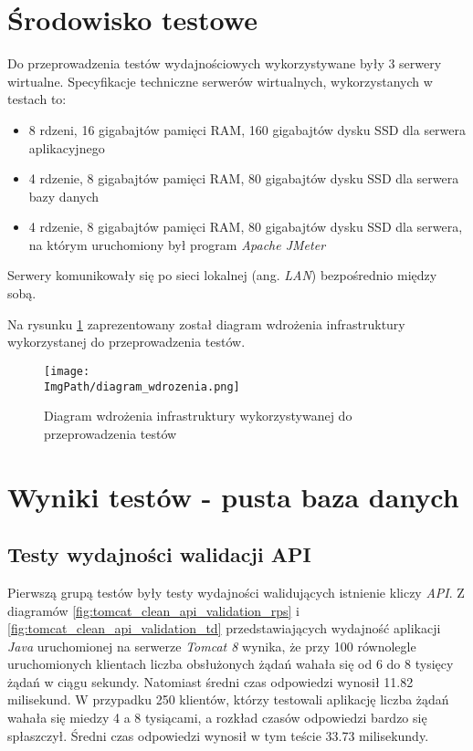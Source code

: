 \section{Środowisko testowe}
Do przeprowadzenia testów wydajnościowych wykorzystywane były 3 serwery wirtualne. Specyfikacje techniczne serwerów wirtualnych, wykorzystanych w testach to: 
\begin{itemize}
    \item 8 rdzeni, 16 gigabajtów pamięci RAM, 160 gigabajtów dysku SSD dla serwera aplikacyjnego
    \item 4 rdzenie, 8 gigabajtów pamięci RAM, 80 gigabajtów dysku SSD dla serwera bazy danych 
    \item 4 rdzenie, 8 gigabajtów pamięci RAM, 80 gigabajtów dysku SSD dla serwera, na którym uruchomiony był program \textsl{Apache JMeter}
\end{itemize}
Serwery komunikowały się po sieci lokalnej (ang. \textsl{LAN}) bezpośrednio między sobą.

Na rysunku \ref{fig:deployment_diagram} zaprezentowany został diagram wdrożenia infrastruktury wykorzystanej do przeprowadzenia testów.
\begin{figure}[!ht]
\centering
\texttt{[image: \\ImgPath/diagram\_wdrozenia.png]}
\caption{Diagram wdrożenia infrastruktury wykorzystywanej do przeprowadzenia testów}
\label{fig:deployment_diagram}
\end{figure}

\newpage
\section{Wyniki testów - pusta baza danych}

\subsection{Testy wydajności walidacji API}
Pierwszą grupą testów były testy wydajności walidujących istnienie kliczy \textsl{API}. Z diagramów \ref{fig:tomcat_clean_api_validation_rps} i \ref{fig:tomcat_clean_api_validation_td} przedstawiających wydajność aplikacji \textsl{Java} uruchomionej na serwerze \textsl{Tomcat 8} wynika, że przy 100 równolegle uruchomionych klientach liczba obsłużonych żądań wahała się od 6 do 8 tysięcy żądań w ciągu sekundy. Natomiast średni czas odpowiedzi wynosił 11.82 milisekund. W przypadku 250 klientów, którzy testowali aplikację liczba żądań wahała się miedzy 4 a 8 tysiącami, a rozkład czasów odpowiedzi bardzo się spłaszczył. Średni czas odpowiedzi wynosił w tym teście 33.73 milisekundy.

